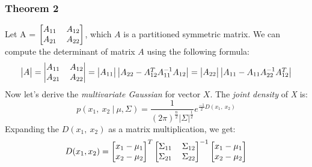 \documentclass[12pt]{article}
\numberwithin{equation}{section}
\numberwithin{table}{section}
\numberwithin{figure}{section}
\begin{document}
\subsubsection*{Theorem 2}
Let A = $
\renewcommand\arraystretch{1}
\setlength\arraycolsep{6pt}
\begin{bmatrix}
A_{11} & A_{12} \\
A_{21} & A_{22}\\
\end{bmatrix}$, which $A$ is a partitioned symmetric matrix. We can compute the determinant of matrix $A$ using the following formula:
$$
\begin{vmatrix}
A
\end{vmatrix}=
	\renewcommand\arraystretch{1}
	\setlength\arraycolsep{6pt}
	\begin{vmatrix}
	A_{11} & A_{12} \\
	A_{21} & A_{22}\\
	\end{vmatrix} = 
	\begin{vmatrix}
	A_{11}
	\end{vmatrix}\begin{vmatrix}
	A_{22} - A_{12}^TA_{11}^{-1}A_{12}
	\end{vmatrix}=\begin{vmatrix}
	A_{22}
	\end{vmatrix}\begin{vmatrix}
	A_{11} - A_{11}A_{22}^{-1}A_{12}^T
	\end{vmatrix}
$$
Now let's derive the \textit{multivariate Gaussian} for vector $X$. The \textit{joint density} of \textit{X} is:
\begin{equation}\label{eq:7.1}
p(x_1,\ x_2\ |\ \mu, \Sigma) = \frac{1}{(2\pi)^\frac{n}{2}|\Sigma|^\frac{1}{2}} e^{\frac{-1}{2}D(x_1,\ x_2)} 
\end{equation}
Expanding the $D(x_1,\ x_2)$ as a matrix multiplication, we get:
$$
	D(x_1, x_2) = \renewcommand\arraystretch{1}
	\setlength\arraycolsep{6pt}
	\begin{bmatrix}
	x_1 - \mu_1\\
	x_2 - \mu_2\\
	\end{bmatrix}^T
	\renewcommand\arraystretch{1}
	\setlength\arraycolsep{6pt}
	\begin{bmatrix}
	\Sigma_{11} & \Sigma_{12} \\
	\Sigma_{21} & \Sigma_{22}\\
	\end{bmatrix}^{-1}\renewcommand\arraystretch{1}
	\setlength\arraycolsep{6pt}
	\begin{bmatrix}
	x_1 - \mu_1\\
	x_2 - \mu_2\\
	\end{bmatrix}	
$$
\end{document}
